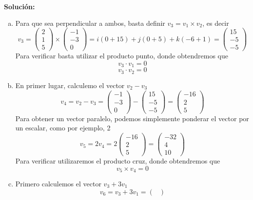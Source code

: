 \documentclass[12pt]{article}
\newenvironment{solucion}
{\begin{mdframed}[backgroundcolor=black!10]
		{\bf Solución:}\\
	}
	{
	\end{mdframed}
}
\newenvironment{preguntas}
{\begin{enumerate}\itemsep12pt
	}
	{
	\end{enumerate}
}
\begin{document}
\begin{preguntas}
\begin{solucion}
\begin{enumerate}[a)]
\item Para que sea perpendicular a ambos, basta definir $v_3 = v_1 \times v_2$, es decir
			$$v_3 = \begin{pmatrix}
			2\\
			1\\
			5
			\end{pmatrix} \times \begin{pmatrix}
			-1\\
			-3\\
			0
			\end{pmatrix} = i (0 + 15) + j (0 + 5) + k(-6 + 1) =\begin{pmatrix}
			15\\
			-5\\
			-5
			\end{pmatrix} $$
			Para verificar basta utilizar el producto punto, donde obtendremos que
			$$v_3 \cdot v_1 = 0$$
			$$v_3 \cdot v_2 = 0$$
\item En primer lugar, calculemo el vector $v_2 - v_3$
			$$v_4 = v_2 - v_3 = \begin{pmatrix}
			-1\\
			-3\\
			0
			\end{pmatrix} - \begin{pmatrix}
			15\\
			-5\\
			-5
			\end{pmatrix} = \begin{pmatrix}
			-16\\
			2\\
			5
			\end{pmatrix}$$
			Para obtener un vector paralelo, podemos simplemente ponderar el vector por un escalar, como por ejemplo, 2
			$$v_5 = 2 v_4 = 2 \begin{pmatrix}
			-16\\
			2\\
			5
			\end{pmatrix} = \begin{pmatrix}
			-32\\
			4\\
			10
			\end{pmatrix}$$
			Para verificar utilizaremos el producto cruz, donde obtendremos que
			$$v_5 \times v_4 = 0$$
\item Primero calculemos el vector $v_3 + 3v_1$
			$$v_6 = v_3 + 3v_1 = \begin{pmatrix}

\end{pmatrix}$$
\end{enumerate}
\end{solucion}
\end{preguntas}
\end{document}
